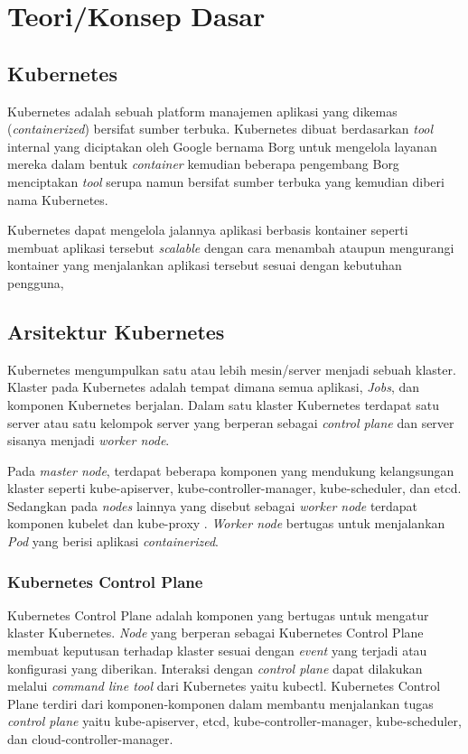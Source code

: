 \section{Teori/Konsep Dasar}

\subsection{Kubernetes}

Kubernetes adalah sebuah platform manajemen aplikasi yang dikemas (\emph{containerized})
bersifat sumber terbuka. Kubernetes dibuat berdasarkan \emph{tool} internal
yang diciptakan oleh Google bernama Borg untuk mengelola layanan mereka dalam bentuk
\emph{container} \parencite{43438} kemudian beberapa pengembang Borg menciptakan
\emph{tool} serupa namun bersifat sumber terbuka yang kemudian diberi nama Kubernetes.

Kubernetes dapat mengelola jalannya aplikasi berbasis kontainer seperti membuat
aplikasi tersebut \emph{scalable} dengan cara menambah ataupun mengurangi kontainer
yang menjalankan aplikasi tersebut sesuai dengan kebutuhan pengguna, 

\subsection{Arsitektur Kubernetes}

Kubernetes mengumpulkan satu atau lebih mesin/server menjadi sebuah klaster. Klaster
pada Kubernetes adalah tempat dimana semua aplikasi, \emph{Jobs}, dan komponen Kubernetes
berjalan. Dalam satu klaster Kubernetes terdapat satu server atau satu kelompok server
yang berperan sebagai \emph{control plane} dan server sisanya menjadi \emph{worker node}.

Pada \emph{master node}, terdapat beberapa komponen yang mendukung kelangsungan
klaster seperti kube-apiserver, kube-controller-manager, kube-scheduler, dan etcd.
Sedangkan pada \emph{nodes} lainnya yang disebut sebagai \emph{worker node}
terdapat komponen kubelet dan kube-proxy \parencite{kubernetes-website-components}.
\emph{Worker node} bertugas untuk menjalankan \emph{Pod} yang berisi aplikasi
\emph{containerized}.

\subsubsection{Kubernetes Control Plane}

Kubernetes Control Plane adalah komponen yang bertugas untuk mengatur
klaster Kubernetes. \emph{Node} yang berperan sebagai Kubernetes Control Plane
membuat keputusan terhadap klaster sesuai dengan \emph{event} yang terjadi atau
konfigurasi yang diberikan. Interaksi dengan \emph{control plane} dapat dilakukan
melalui \emph{command line tool} dari Kubernetes yaitu kubectl.
Kubernetes Control Plane terdiri dari komponen-komponen
dalam membantu menjalankan tugas \emph{control plane} yaitu kube-apiserver,
etcd, kube-controller-manager, kube-scheduler, dan cloud-controller-manager.

